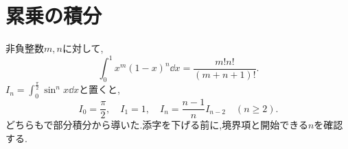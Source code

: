\section{累乗の積分}
非負整数$m,n$に対して,
\[
 \int_0^1x^m(1-x)^n\dd x=\frac{m!n!}{(m+n+1)!}.
\]
$I_n=\int_0^{\frac\pi2}\sin^n x\dd x$と置くと,
\[
 I_0=\frac\pi2,\quad I_1=1,\quad
 I_n=\frac{n-1}{n}I_{n-2}\quad(n\ge2).
\]
どちらもで部分積分から導いた.添字を下げる前に,境界項と開始できる$n$を確認する.

